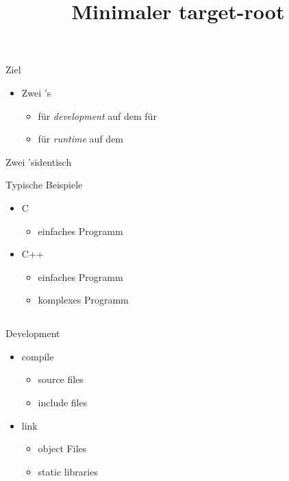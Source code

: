 \documentclass{beamer}
\begin{document}
\title{Minimaler target-root}
\frame{\titlepage}

\begin{frame}{Ziel}
 \begin{itemize}
  \item Zwei 's
  \begin{itemize}
   \item für {\em development} auf dem \host für \targetS
   \item für {\em runtime} auf dem \targetS
  \end{itemize}
 \end{itemize}
\end{frame}

\begin{frame}{Zwei 's}{identisch}
\begin{minipage}{0.375\textwidth}
{
}
\end{minipage}
\begin{minipage}{0.375\textwidth}
{
}
\end{minipage}
\end{frame}


\begin{frame}{Typische Beispiele}
 \begin{itemize}
  \item C
  \begin{itemize}
   \item {} einfaches Programm
  \end{itemize}
  \item C++
  \begin{itemize}
   \item {} einfaches Programm
   \item {} komplexes Programm
  \end{itemize}
 \end{itemize}
\end{frame}

\subsection{}
\begin{frame}{Development}{\target}
 \begin{itemize}
  \item compile
  \begin{itemize}
   \item source files
   \item include files
  \end{itemize}
  \item link
  \begin{itemize}
   \item object Files 
   \item static libraries 
  \end{itemize}
 \end{itemize}
\end{frame}
\end{document}
